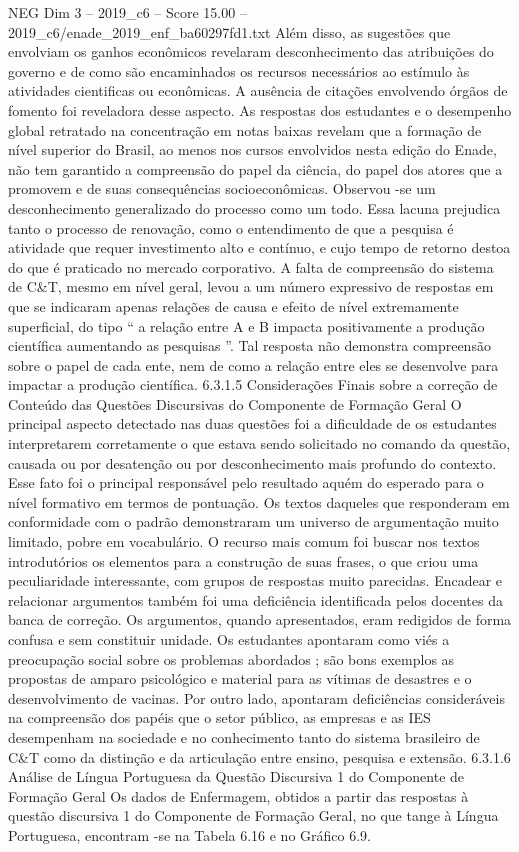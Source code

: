 \begin{textsample}{NEG Dim 3 – 2019\_c6 – Score 15.00 – 2019\_c6/enade\_2019\_enf\_ba60297fd1.txt}
Além disso, as sugestões que envolviam os ganhos econômicos revelaram desconhecimento das atribuições do governo e de como são encaminhados os recursos necessários ao estímulo às atividades cientificas ou econômicas.
A ausência de citações envolvendo órgãos de fomento foi reveladora desse aspecto.
As respostas dos estudantes e o desempenho global retratado na concentração em notas baixas revelam que a formação de nível superior do Brasil, ao menos nos cursos envolvidos nesta edição do Enade, não tem garantido a compreensão do papel da ciência, do papel dos atores que a promovem e de suas consequências socioeconômicas.
Observou -se um desconhecimento generalizado do processo como um todo.
Essa lacuna prejudica tanto o processo de renovação, como o entendimento de que a pesquisa é atividade que requer investimento alto e contínuo, e cujo tempo de retorno destoa do que é praticado no mercado corporativo.
A falta de compreensão do sistema de C\&T, mesmo em nível geral, levou a um número expressivo de respostas em que se indicaram apenas relações de causa e efeito de nível extremamente superficial, do tipo “ a relação entre A e B impacta positivamente a produção científica aumentando as pesquisas ”.
Tal resposta não demonstra compreensão sobre o papel de cada ente, nem de como a relação entre eles se desenvolve para impactar a produção científica. 6.3.1.5 Considerações Finais sobre a correção de Conteúdo das Questões Discursivas do Componente de Formação Geral O principal aspecto detectado nas duas questões foi a dificuldade de os estudantes interpretarem corretamente o que estava sendo solicitado no comando da questão, causada ou por desatenção ou por desconhecimento mais profundo do contexto.
Esse fato foi o principal responsável pelo resultado aquém do esperado para o nível formativo em termos de pontuação.
Os textos daqueles que responderam em conformidade com o padrão demonstraram um universo de argumentação muito limitado, pobre em vocabulário.
O recurso mais comum foi buscar nos textos introdutórios os elementos para a construção de suas frases, o que criou uma peculiaridade interessante, com grupos de respostas muito parecidas.
Encadear e relacionar argumentos também foi uma deficiência identificada pelos docentes da banca de correção.
Os argumentos, quando apresentados, eram redigidos de forma confusa e sem constituir unidade.
Os estudantes apontaram como viés a preocupação social sobre os problemas abordados ; são bons exemplos as propostas de amparo psicológico e material para as vítimas de desastres e o desenvolvimento de vacinas.
Por outro lado, apontaram deficiências consideráveis na compreensão dos papéis que o setor público, as empresas e as IES desempenham na sociedade e no conhecimento tanto do sistema brasileiro de C\&T como da distinção e da articulação entre ensino, pesquisa e extensão. 6.3.1.6 Análise de Língua Portuguesa da Questão Discursiva 1 do Componente de Formação Geral Os dados de Enfermagem, obtidos a partir das respostas à questão discursiva 1 do Componente de Formação Geral, no que tange à Língua Portuguesa, encontram -se na Tabela 6.16 e no Gráfico 6.9.

\end{textsample}
